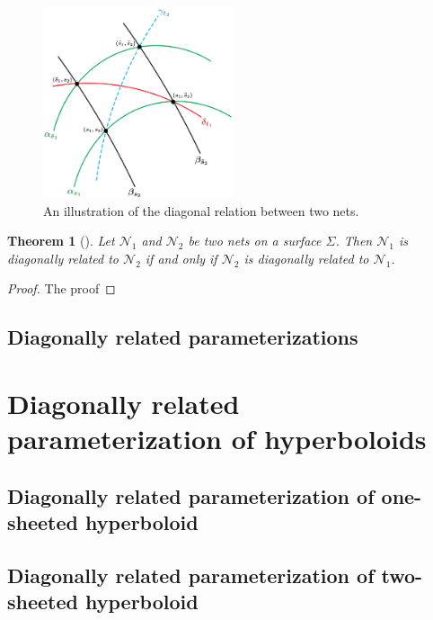 \documentclass[12pt,a4paper]{article}
\newtheorem{theorem}{Theorem}[section]
\theoremstyle{definition}
\theoremstyle{remark}
\theoremstyle{definition}
\begin{document}
\begin{figure}[h]
    \centering
    \includegraphics[width=0.5\textwidth]{diagonally_related_diagram.png}
    \caption{An illustration of the diagonal relation between two nets.}
    \label{fig:diagonally-related-nets}
\end{figure}

\begin{theorem}[]
\label{thm:symmetric-definition-diagonal-nets}
Let $\mathcal{N}_1$ and $\mathcal{N}_2$ be two nets on a surface $\Sigma$. Then $\mathcal{N}_1$ is diagonally related to
$\mathcal{N}_2$ if and only if $\mathcal{N}_2$ is diagonally related to $\mathcal{N}_1$.
\end{theorem}

\begin{proof}
    The proof
\end{proof}

\subsection{Diagonally related parameterizations}
\pagebreak
\section{Diagonally related parameterization of hyperboloids}
\subsection{Diagonally related parameterization of one-sheeted hyperboloid}
\subsection{Diagonally related parameterization of two-sheeted hyperboloid}
\pagebreak
\end{document}
